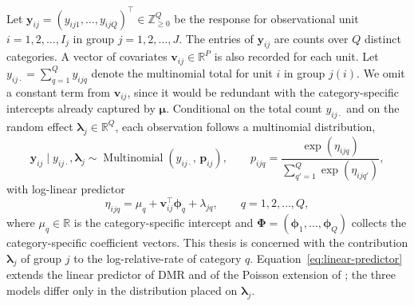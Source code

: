 Let $\bm{y}_{ij}=(y_{ij1},\dots,y_{ijQ})^\top\in\mathbb{Z}_{\geq0}^Q$ be the response for observational unit $i=1,2,\dots,I_j$ in group $j=1,2,\dots,J$. The entries of $\bm{y}_{ij}$ are counts over $Q$ distinct categories. A vector of covariates $\bm{v}_{ij}\in\mathbb{R}^P$ is also recorded for each unit. Let $y_{ij\cdot}=\sum_{q=1}^Q y_{ijq}$ denote the multinomial total for unit $i$ in group $j(i)$. We omit a constant term from $\bm{v}_{ij}$, since it would be redundant with the category-specific intercepts already captured by $\bm\mu$. Conditional on the total count $y_{ij\cdot}$ and on the random effect $\bm\lambda_j\in\mathbb{R}^Q$, each observation follows a multinomial distribution,
\begin{equation}
\bm{y}_{ij}\mid y_{ij\cdot},\bm\lambda_j\sim\operatorname{Multinomial}\left(y_{ij\cdot},\,\bm{p}_{ij}\right),\qquad p_{ijq}=\frac{\exp(\eta_{ijq})}{\sum_{q'=1}^Q\exp(\eta_{ijq'})},
\label{eq:conditional-pm}
\end{equation}
with log-linear predictor
\begin{equation}
\eta_{ijq}=\mu_q+\bm{v}_{ij}^\top\bm\phi_q+\lambda_{jq},\qquad q=1,2,\dots,Q,
\label{eq:linear-predictor}
\end{equation}
where $\mu_q\in\mathbb{R}$ is the category-specific intercept and $\bm\Phi=(\bm\phi_1,\dots,\bm\phi_Q)$ collects the category-specific coefficient vectors.
This thesis is concerned with the contribution $\bm\lambda_j$ of group $j$ to the log-relative-rate of category $q$. Equation~\eqref{eq:linear-predictor} extends the linear predictor of DMR \citep{Taddy2015} and of the Poisson extension of \citet{Lee2017}; the three models differ only in the distribution placed on $\bm\lambda_j$.



